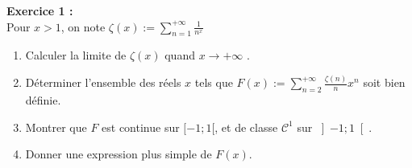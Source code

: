 \documentclass[11pt,a4paper]{article}
\begin{document}
\textbf{Exercice 1 :}  \\
Pour $x>1$, on note $ \zeta (x) := \displaystyle \sum_{n=1}^{+\infty} \frac{1}{n^x}$ \\

\begin{enumerate}
\item Calculer la limite de $\zeta (x)$ quand $x \to +\infty$ .
\item Déterminer l'ensemble des réels $x$ tels que $ F(x) := \displaystyle \sum_{n=2}^{+\infty} \frac{\zeta(n)}{n}x^n$ soit bien définie.
\item Montrer que $F$ est continue sur $[-1;1[$, et de classe $\mathcal{C}^1$ sur $\left ] -1;1 \right [$.
\item Donner une expression plus simple de $F(x)$. \\
\end{enumerate} 
\end{document}
